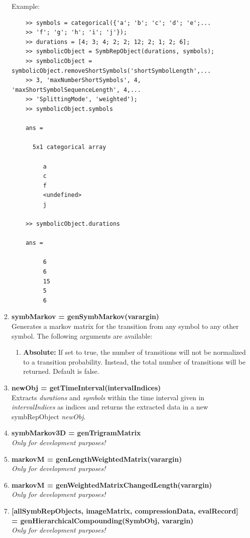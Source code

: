 \documentclass[a4]{scrreprt}
\begin{document}
\begin{enumerate}
    Example:
    
    \begin{verbatim}
    >> symbols = categorical({'a'; 'b'; 'c'; 'd'; 'e';...
    >> 'f'; 'g'; 'h'; 'i'; 'j'});
    >> durations = [4; 3; 4; 2; 2; 12; 2; 1; 2; 6];
    >> symbolicObject = SymbRepObject(durations, symbols);
    >> symbolicObject = symbolicObject.removeShortSymbols('shortSymbolLength',...
    >> 3, 'maxNumberShortSymbols', 4, 'maxShortSymbolSequenceLength', 4,...
    >> 'SplittingMode', 'weighted');
    >> symbolicObject.symbols
    
    ans = 
    
      5x1 categorical array
    
         a 
         c 
         f 
         <undefined> 
         j 
    
    >> symbolicObject.durations
    
    ans =
    
         6
         6
         15
         5
         6
    \end{verbatim}
    
    \item \textbf{symbMarkov = genSymbMarkov(varargin)}\\
    Generates a markov matrix for the transition from any symbol to any other symbol. The following arguments are available:
    \begin{enumerate}
    	\item \textbf{Absolute: } If set to true, the number of transitions will not be normalized to a transition probability. Instead, the total number of transitions will be returned. Default is false.
    \end{enumerate}

    \item \textbf{newObj = getTimeInterval(intervalIndices)}\\
	Extracts \textit{durations} and \textit{symbols} within the time interval given in \textit{intervalIndices} as indices and returns the extracted data in a new symbRepObject \textit{newObj}.

	\item \textbf{symbMarkov3D = genTrigramMatrix}\\
	\textit{Only for development purposes!}
	
	\item \textbf{markovM = genLengthWeightedMatrix(varargin)}\\
	\textit{Only for development purposes!}
	
	\item \textbf{markovM = genWeightedMatrixChangedLength(varargin)}\\
	\textit{Only for development purposes!}
	
	\item \textbf{[allSymbRepObjects, imageMatrix, compressionData, evalRecord] = genHierarchicalCompounding(SymbObj, varargin)}\\
	\textit{Only for development purposes!}
	
\end{enumerate}
\end{document}
